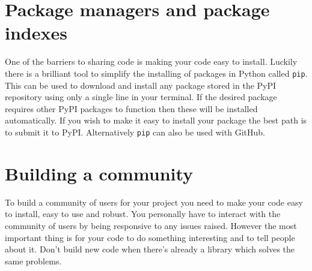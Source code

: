 \documentclass{article}
\begin{document}
\section*{Package managers and package indexes}
One of the barriers to sharing code is making your code easy to install. Luckily there is a brilliant tool to simplify the installing of packages in Python called \texttt{pip}. This can be used to download and install any package stored in the PyPI repository using only a single line in your terminal. If the desired package requires other PyPI packages to function then these will be installed automatically. If you wish to make it easy to install your package the best path is to submit it to PyPI. Alternatively \texttt{pip} can also be used with GitHub.

\section*{Building a community}
To build a community of users for your project you need to make your code easy to install, easy to use and robust. You personally have to interact with the community of users by being responsive to any issues raised. However the most important thing is for your code to do something interesting and to tell people about it. Don't build new code when there's already a library which solves the same problems.  
\end{document}
